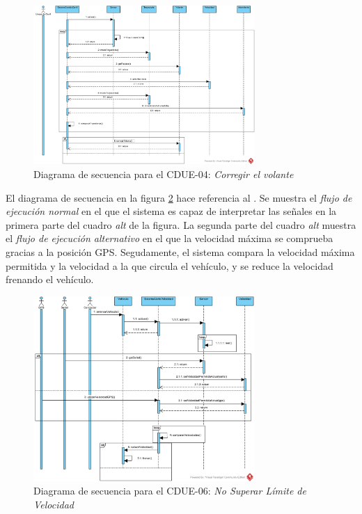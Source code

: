\clearpage

\begin{figure}[h]
  \begin{center}
    \includegraphics[width=0.75\textwidth]{./img/diagramas_de_secuencia/CDUE-04.png}
  \end{center}
  \caption{Diagrama de secuencia para el CDUE-04: \textit{Corregir el volante}}
  \label{img:corregir_volante}
\end{figure}

\par El diagrama de secuencia  en la figura \ref{img:limite_velocidad} hace referencia al . Se muestra el \textit{flujo de ejecución normal} en el que el sistema es capaz de interpretar las señales en la primera parte del cuadro \textit{alt} de la figura. La segunda parte del cuadro \textit{alt} muestra el \textit{flujo de ejecución alternativo} en el que la velocidad máxima se comprueba gracias a la posición GPS. Segudamente, el sistema compara la velocidad máxima permitida y la velocidad a la que circula el vehículo, y se reduce la velocidad frenando el vehículo.

\begin{figure}[h]
  \begin{center}
    \includegraphics[width=0.75\textwidth]{./img/diagramas_de_secuencia/CDUE-06.png}
  \end{center}
  \caption{Diagrama de secuencia para el CDUE-06: \textit{No Superar Límite de Velocidad}}
  \label{img:limite_velocidad}
\end{figure}


